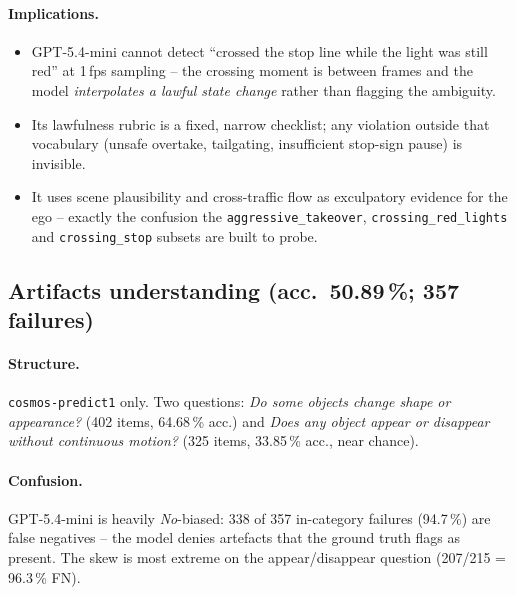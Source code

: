 \documentclass[11pt,a4paper]{article}
\newcommand{\pct}[1]{#1\,\%}
\newcommand{\code}[1]{\texttt{#1}}
\begin{document}
\paragraph{Implications.}
\begin{itemize}
  \item GPT-5.4-mini cannot detect ``crossed the stop line while
  the light was still red'' at 1\,fps sampling -- the crossing moment
  is between frames and the model \emph{interpolates a lawful state
  change} rather than flagging the ambiguity.
  \item Its lawfulness rubric is a fixed, narrow checklist; any
  violation outside that vocabulary (unsafe overtake, tailgating,
  insufficient stop-sign pause) is invisible.
  \item It uses scene plausibility and cross-traffic flow as
  exculpatory evidence for the ego -- exactly the confusion the
  \code{aggressive\_takeover}, \code{crossing\_red\_lights} and
  \code{crossing\_stop} subsets are built to probe.
\end{itemize}

\subsection{Artifacts understanding (acc.~\pct{50.89}; \num{357} failures)}
\label{sec:artifacts}

\paragraph{Structure.} \code{cosmos-predict1} only. Two questions:
\emph{Do some objects change shape or appearance?} (402 items,
\pct{64.68} acc.) and \emph{Does any object appear or disappear
without continuous motion?} (325 items, \pct{33.85} acc., near chance).

\paragraph{Confusion.} GPT-5.4-mini is heavily \emph{No}-biased: 338
of 357 in-category failures (\pct{94.7}) are false negatives -- the
model denies artefacts that the ground truth flags as present. The
skew is most extreme on the appear/disappear question (207/215 =
\pct{96.3} FN).
\end{document}

